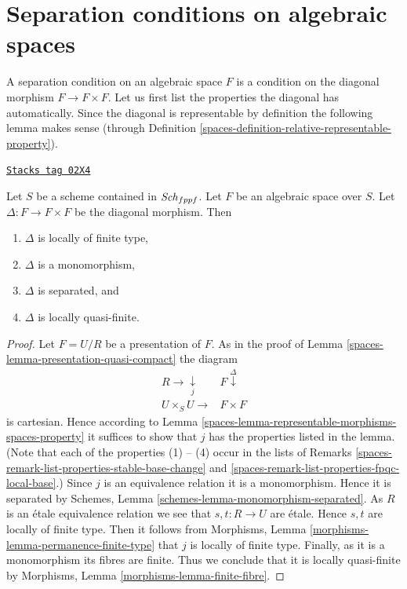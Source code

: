 \section{Separation conditions on algebraic spaces}
\label{spaces-section-separation}
A separation condition on an algebraic space $F$ is a condition
on the diagonal morphism $F \to F \times F$. Let us first
list the properties the diagonal has automatically.
Since the diagonal is representable by definition the following lemma
makes sense (through
Definition \ref{spaces-definition-relative-representable-property}).

\begin{lemma}
\label{spaces-lemma-properties-diagonal}
\href{https://stacks.math.columbia.edu/tag/02X4}{\texttt{Stacks tag 02X4}}

Let $S$ be a scheme contained in $\mathit{Sch}_{fppf}$.
Let $F$ be an algebraic space over $S$.
Let $\Delta : F \to F \times F$ be the diagonal morphism.
Then
\begin{enumerate}
\item $\Delta$ is locally of finite type,
\item $\Delta$ is a monomorphism,
\item $\Delta$ is separated, and
\item $\Delta$ is locally quasi-finite.
\end{enumerate}
\end{lemma}

\begin{proof}

Let $F = U/R$ be a presentation of $F$.
As in the proof of Lemma \ref{spaces-lemma-presentation-quasi-compact} the diagram
$$
\begin{array}{cc}R \longrightarrow\underset{j}{\downarrow} & F \overset{\Delta}{\downarrow} \\ U \times_S U \longrightarrow & F \times F\end{array}
$$
is cartesian. Hence according to
Lemma \ref{spaces-lemma-representable-morphisms-spaces-property}
it suffices to show that $j$ has the properties listed in the lemma.
(Note that each of the properties (1) -- (4) occur in the lists
of Remarks \ref{spaces-remark-list-properties-stable-base-change}
and \ref{spaces-remark-list-properties-fpqc-local-base}.)
Since $j$ is an equivalence relation it is a monomorphism.
Hence it is separated by
Schemes, Lemma \ref{schemes-lemma-monomorphism-separated}.
As $R$ is an \'etale equivalence relation we see that
$s, t : R \to U$ are \'etale. Hence $s, t$ are locally of finite
type. Then it follows from
Morphisms, Lemma \ref{morphisms-lemma-permanence-finite-type} that
$j$ is locally of finite type. Finally, as it is a monomorphism
its fibres are finite. Thus we conclude that it is locally quasi-finite by
Morphisms, Lemma \ref{morphisms-lemma-finite-fibre}.
\end{proof}

